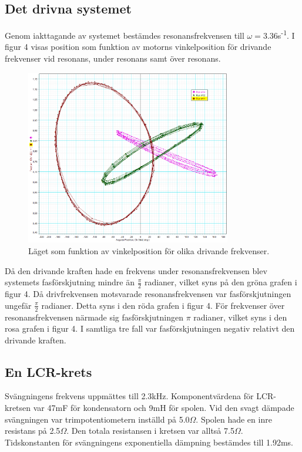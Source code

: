 \documentclass[a4paper,10pt]{article}
\begin{document}
\subsection{Det drivna systemet}
Genom iakttagande av systemet bestämdes resonansfrekvensen till $\omega=3.36$s\textsuperscript{-1}. I figur 4 visas position som funktion av motorns vinkelposition för drivande frekvenser vid resonans, under resonans samt över resonans.
\begin{figure}[H]
	\centering
	\includegraphics[width=0.8\textwidth]{../bilder/pos_vs_ang_uppg2b.png}
	\caption{Läget som funktion av vinkelposition för olika drivande frekvenser.}
\end{figure}
Då den drivande kraften hade en frekvens under resonansfrekvensen blev systemets fasförskjutning mindre än $\frac{\pi}{2}$ radianer, vilket syns på den gröna grafen i figur 4. Då drivfrekvensen motsvarade resonansfrekvensen var fasförskjutningen ungefär $\frac{\pi}{2}$ radianer. Detta syns i den röda grafen i figur 4. För frekvenser över resonansfrekvensen närmade sig fasförskjutningen $\pi$ radianer, vilket syns i den rosa grafen i figur 4. I samtliga tre fall var fasförskjutningen negativ relativt den drivande kraften.

\subsection{En LCR-krets}
Svängningens frekvens uppmättes till 2.3kHz. Komponentvärdena för LCR-kretsen var 47mF för kondensatorn och 9mH för spolen. Vid den svagt dämpade svängningen var trimpotentiometern inställd på 5.0$\Omega$. Spolen hade en inre resistans på 2.5$\Omega$. Den totala resistansen i kretsen var alltså 7.5$\Omega$. Tidskonstanten för svängningens exponentiella dämpning bestämdes till 1.92ms.
\end{document}
